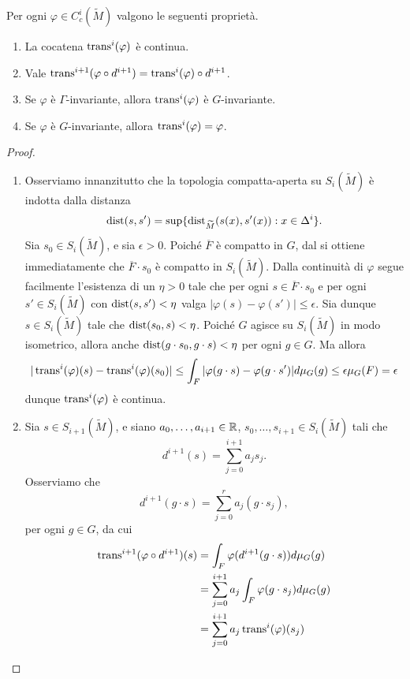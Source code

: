 \begin{proposition}
Per ogni $\varphi\in C^i_c(\widetilde M)$ valgono le seguenti proprietà.
\begin{enumerate}
\item La cocatena $\operatorname{trans}^i(\varphi)$ è continua.
\item Vale $\operatorname{trans}^{i+1}(\varphi\circ d^{i+1})=\operatorname{trans}^i(\varphi)\circ d^{i+1}$.
\item Se $\varphi$ è $\Gamma$-invariante, allora $\operatorname{trans}^i(\varphi)$ è $G$-invariante.
\item Se $\varphi$ è $G$-invariante, allora $\operatorname{trans}^i(\varphi)=\varphi$.
\end{enumerate}
\end{proposition}
\begin{proof}\leavevmode
\begin{enumerate}
\item Osserviamo innanzitutto che la topologia compatta-aperta su $S_i(\widetilde M)$ è indotta dalla distanza
\[
\operatorname{dist}(s,s')=\sup\{\operatorname{dist}_{\widetilde M}(s(x),s'(x)):x\in\Delta^i\}.
\]
Sia $s_0\in S_i(\widetilde M)$, e sia $\epsilon>0$. Poiché $\overline{F}$ è compatto in $G$, dal  si ottiene immediatamente che $\overline{F}\cdot s_0$ è compatto in $S_i(\widetilde M)$. Dalla continuità di $\varphi$ segue facilmente l'esistenza di un $\eta>0$ tale che per ogni $s\in\overline{F}\cdot s_0$ e per ogni $s'\in S_i(\widetilde M)$ con $\operatorname{dist}(s,s')<\eta$ valga $|\varphi(s)-\varphi(s')|\le\epsilon$. Sia dunque $s\in S_i(\widetilde M)$ tale che $\operatorname{dist}(s_0,s)<\eta$. Poiché $G$ agisce su $S_i(\widetilde M)$ in modo isometrico, allora anche $\operatorname{dist}(g\cdot s_0,g\cdot s)<\eta$ per ogni $g\in G$. Ma allora
\[
|\operatorname{trans}^i(\varphi)(s)-\operatorname{trans}^i(\varphi)(s_0)|\le\int_F|\varphi(g\cdot s)-\varphi(g\cdot s')|d\mu_G(g)\le\epsilon\mu_G(F)=\epsilon
\]
dunque $\operatorname{trans}^i(\varphi)$ è continua.
\item Sia $s\in S_{i+1}(\widetilde M)$, e siano $a_0,\ldots,a_{i+1}\in\mathbb{R}$, $s_0,\ldots,s_{i+1}\in S_i(\widetilde M)$ tali che
\[
d^{i+1}(s)=\sum_{j=0}^{i+1}a_js_j.
\]
Osserviamo che
\[
d^{i+1}(g\cdot s)=\sum_{j=0}^ra_j(g\cdot s_j),
\]
per ogni $g\in G$, da cui
\begin{align*}
\trans^{i+1}(\varphi\circ d^{i+1})(s)&=\int_F\varphi(d^{i+1}(g\cdot s))d\mu_G(g)\\
&=\sum_{j=0}^{i+1}a_j\int_F\varphi(g\cdot s_j)d\mu_G(g)\\
&=\sum_{j=0}^{i+1}a_j\trans^i(\varphi)(s_j)\\

\end{align*}
\end{enumerate}
\end{proof}
